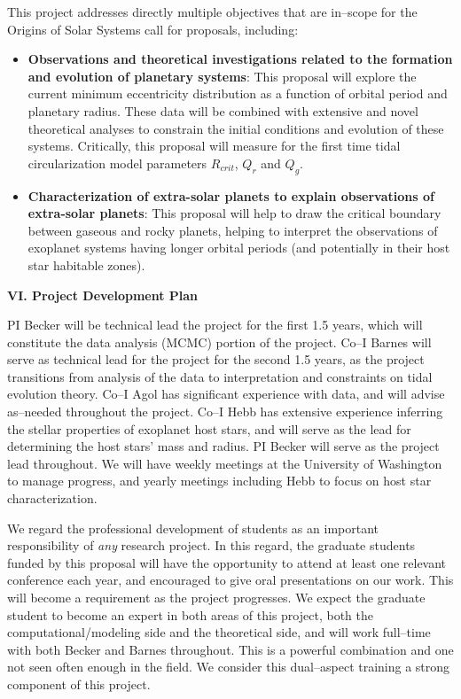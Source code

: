 This project addresses directly multiple objectives that are in--scope
for the Origins of Solar Systems call for proposals, including:
\begin{itemize}

\item {\bf Observations and theoretical investigations related to the formation 
  and evolution of planetary systems}: This proposal will explore the
  current minimum eccentricity distribution as a function of orbital
  period and planetary radius.  These data will be combined with
  extensive and novel theoretical analyses to constrain the initial
  conditions and evolution of these systems.  Critically, this
  proposal will measure for the first time tidal circularization model
  parameters $R_{crit}$, $Q_{r}$ and $Q_{g}$.

\item {\bf Characterization of extra-solar planets to explain
  observations of extra-solar planets}: This proposal will help to
  draw the critical boundary between gaseous and rocky planets,
  helping to interpret the observations of exoplanet systems having
  longer orbital periods (and potentially in their host star habitable
  zones).

\end{itemize}

\bigskip
\centerline{\bf VI. Project Development Plan}
\smallskip

PI Becker will be technical lead the project for the first 1.5 years,
which will constitute the data analysis (MCMC) portion of the project.
Co--I Barnes will serve as technical lead for the project for the
second 1.5 years, as the project transitions from analysis of the data
to interpretation and constraints on tidal evolution theory.  Co--I
Agol has significant experience with \kepler data, and will advise
as--needed throughout the project.  Co--I Hebb has extensive
experience inferring the stellar properties of exoplanet host stars,
and will serve as the lead for determining the host stars' mass and
radius.  PI Becker will serve as the project lead throughout.  We will
have weekly meetings at the University of Washington to manage
progress, and yearly meetings including Hebb to focus on host star
characterization.

We regard the professional development of students as an important
responsibility of {\it any} research project.  In this regard, the
graduate students funded by this proposal will have the opportunity to
attend at least one relevant conference each year, and encouraged to
give oral presentations on our work.  This will become a requirement
as the project progresses.  We expect the graduate student to become
an expert in both areas of this project, both the
computational/modeling side and the theoretical side, and will work
full--time with both Becker and Barnes throughout.  This is a powerful
combination and one not seen often enough in the field.  We consider
this dual--aspect training a strong component of this project.

